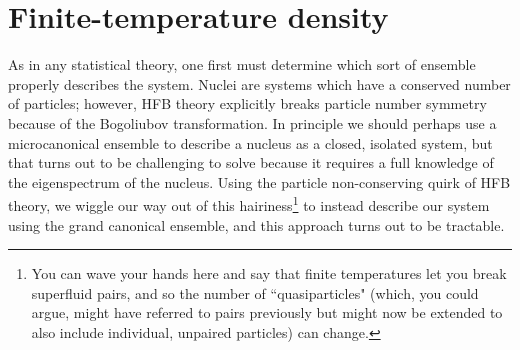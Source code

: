 %
%



\section{Finite-temperature density}

As in any statistical theory, one first must determine which sort of ensemble properly describes the system. Nuclei are systems which have a conserved number of particles; however, HFB theory explicitly breaks particle number symmetry because of the Bogoliubov transformation. In principle we should perhaps use a microcanonical ensemble to describe a nucleus as a closed, isolated system, but that turns out to be challenging to solve because it requires a full knowledge of the eigenspectrum of the nucleus. Using the particle non-conserving quirk of HFB theory, we wiggle our way out of this hairiness\footnote{You can wave your hands here and say that finite temperatures let you break superfluid pairs, and so the number of ``quasiparticles" (which, you could argue, might have referred to pairs previously but might now be extended to also include individual, unpaired particles) can change.} to instead describe our system using the grand canonical ensemble, and this approach turns out to be tractable.

